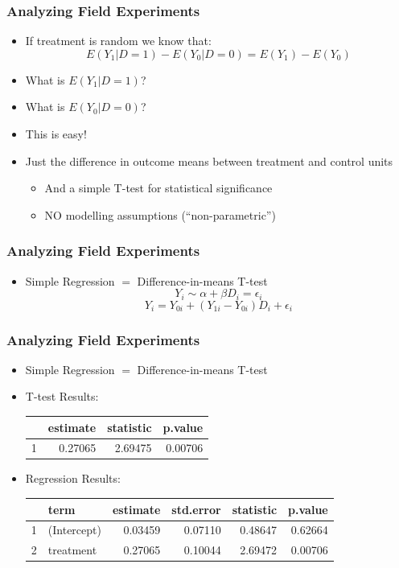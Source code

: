 \documentclass[xcolor=x11names,compress]{beamer}\usepackage[]{graphicx}\usepackage[]{color}
\renewcommand{\(}{\begin{columns}}
\renewcommand{\)}{\end{columns}}
\newcommand{\<}[1]{\begin{column}{#1}}
\renewcommand{\>}{\end{column}}
\begin{document}
\begin{frame}
\frametitle{Analyzing Field Experiments}
\begin{itemize}
\item If treatment is random we know that:
$$E(Y_1|D=1) - E(Y_0|D=0) = E(Y_1) - E(Y_0) $$
\pause
\item What is $E(Y_1|D=1)$? 
\pause 
\item What is $E(Y_0|D=0)$?
\pause
\item This is easy! 
\pause
\item Just the difference in outcome means between treatment and control units
\pause
\begin{itemize}
\item And a simple T-test for statistical significance
\pause
\item NO modelling assumptions (``non-parametric'')
\end{itemize}
\end{itemize}
\end{frame}

\begin{frame}
\frametitle{Analyzing Field Experiments}
\begin{itemize}
\item Simple Regression $=$ Difference-in-means T-test
\pause
$$Y_i \sim \alpha + \beta D_i = \epsilon_i$$
\pause
$$Y_i = Y_{0i} + (Y_{1i} - Y_{0i}) D_i + \epsilon_i$$
\pause
\end{itemize}
\end{frame}

\begin{frame}
\frametitle{Analyzing Field Experiments}
\begin{itemize}
\item Simple Regression $=$ Difference-in-means T-test
\pause
\footnotesize
\item T-test Results:
\begin{table}[ht]
\centering
\begin{tabular}{rrrr}
  \hline
 & estimate & statistic & p.value \\ 
  \hline
1 & 0.27065 & 2.69475 & 0.00706 \\ 
   \hline
\end{tabular}
\end{table}

\pause
\item Regression Results:
\begin{table}[ht]
\centering
\begin{tabular}{rlrrrr}
  \hline
 & term & estimate & std.error & statistic & p.value \\ 
  \hline
1 & (Intercept) & 0.03459 & 0.07110 & 0.48647 & 0.62664 \\ 
  2 & treatment & 0.27065 & 0.10044 & 2.69472 & 0.00706 \\ 
   \hline
\end{tabular}
\end{table}

\end{itemize}
\normalsize
\end{frame}
\end{document}
